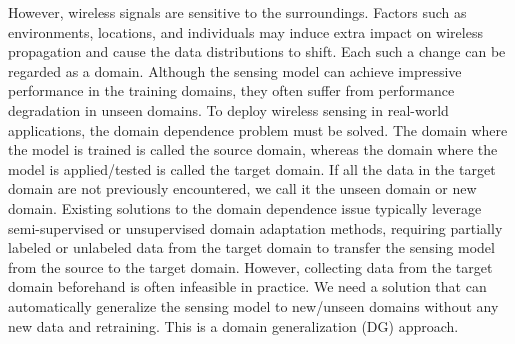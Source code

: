\documentclass[journal]{IEEEtran}
\begin{document}
However, wireless signals are sensitive to the surroundings. Factors such as environments, locations, and individuals may induce extra impact on wireless propagation and cause the data distributions to shift. Each such a change can be regarded as a domain. Although the sensing model can achieve impressive performance in the training domains, they often suffer from performance degradation in unseen domains. To deploy wireless sensing in real-world applications, the domain dependence problem must be solved. The domain where the model is trained is called the source domain, whereas the domain where the model is applied/tested is called the target domain. If all the data in the target domain are not previously encountered, we call it the unseen domain or new domain. Existing solutions to the domain dependence issue typically leverage semi-supervised or unsupervised domain adaptation methods, requiring partially labeled or unlabeled data from the target domain to transfer the sensing model from the source to the target domain. However, collecting data from the target domain beforehand is often infeasible in practice. We need a solution that can automatically generalize the sensing model to new/unseen domains without any new data and retraining. This is a domain generalization (DG) approach.
\end{document}
